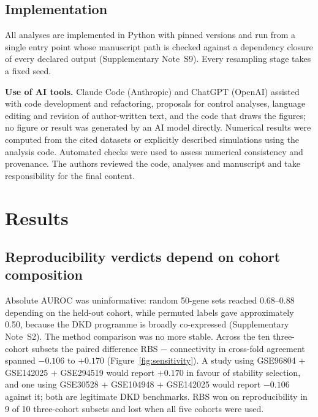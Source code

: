 \documentclass[unnumsec,webpdf,contemporary,large,numbered]{oup-authoring-template}
\begin{document}
\subsection{Implementation}\label{sec:implementation}

All analyses are implemented in Python with pinned versions and run from a single entry point
whose manuscript path is checked against a dependency closure of every declared output
(Supplementary Note~S9). Every resampling stage takes a fixed seed.

\textbf{Use of AI tools.} Claude Code (Anthropic) and ChatGPT (OpenAI) assisted with code
development and refactoring, proposals for control analyses, language editing and revision of
author-written text, and the code that draws the figures; no figure or result was generated by
an AI model directly. Numerical results were computed from the cited datasets or explicitly
described simulations using the analysis code. Automated checks were used to assess numerical
consistency and provenance. The authors reviewed the code, analyses and manuscript and take
responsibility for the final content.


\section{Results}\label{sec:results}

\subsection{Reproducibility verdicts depend on cohort composition}\label{sec:sensitivity}

Absolute AUROC was uninformative: random 50-gene sets reached 0.68--0.88 depending on the held-out
cohort, while permuted labels gave approximately 0.50, because the DKD programme is broadly
co-expressed (Supplementary Note~S2). The method comparison was no more stable. Across the ten
three-cohort subsets the paired difference RBS $-$ connectivity in cross-fold agreement spanned
$-0.106$ to $+0.170$ (Figure~\ref{fig:sensitivity}). A study using GSE96804 $+$ GSE142025 $+$
GSE294519 would report $+0.170$ in favour of stability selection, and one using GSE30528 $+$
GSE104948 $+$ GSE142025 would report $-0.106$ against it; both are legitimate DKD benchmarks.
RBS won on reproducibility in 9 of 10 three-cohort subsets and lost when all five cohorts were used.
\end{document}
